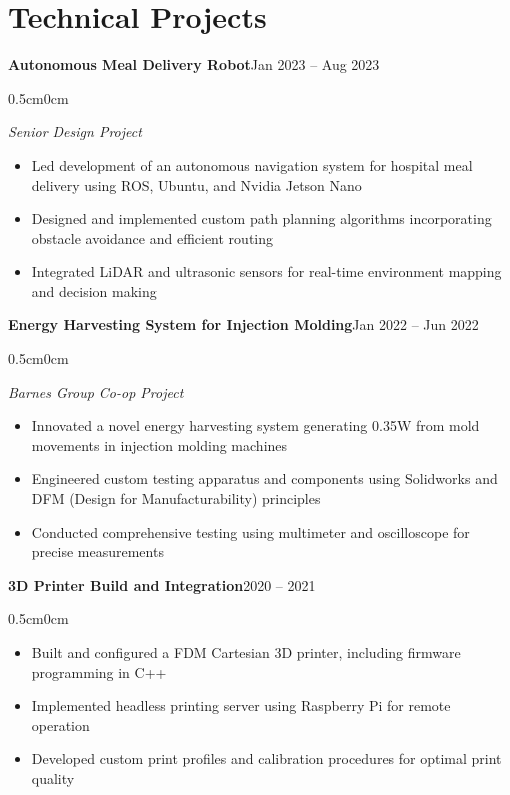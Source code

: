 \documentclass[10pt]{article}
\newenvironment{onecolentry}{
    \begin{adjustwidth}{0.5cm}{0cm}
}{
    \end{adjustwidth}
}
\newenvironment{highlights}{
    \begin{itemize}[
        leftmargin=0.5cm,
        rightmargin=0cm,
        itemindent=0cm,
        labelwidth=0.3cm,
        labelsep=0.2cm,
        align=left,
        itemsep=0.05cm,
        topsep=0.05cm,
        parsep=0.05cm,
        partopsep=0pt
    ]
}{
    \end{itemize}
    \vspace{0.1cm}
}
\begin{document}
    \section{Technical Projects}
    \begin{twocolentry}{\textbf{Autonomous Meal Delivery Robot}}{Jan 2023 -- Aug 2023}
    \end{twocolentry}
    \begin{onecolentry}
    \textit{Senior Design Project}
    \begin{highlights}
        \item Led development of an autonomous navigation system for hospital meal delivery using ROS, Ubuntu, and Nvidia Jetson Nano
        \item Designed and implemented custom path planning algorithms incorporating obstacle avoidance and efficient routing
        \item Integrated LiDAR and ultrasonic sensors for real-time environment mapping and decision making
    \end{highlights}
    \end{onecolentry}

    \begin{twocolentry}{\textbf{Energy Harvesting System for Injection Molding}}{Jan 2022 -- Jun 2022}
    \end{twocolentry}
    \begin{onecolentry}
    \textit{Barnes Group Co-op Project}
    \begin{highlights}
        \item Innovated a novel energy harvesting system generating 0.35W from mold movements in injection molding machines
        \item Engineered custom testing apparatus and components using Solidworks and DFM (Design for Manufacturability) principles
        \item Conducted comprehensive testing using multimeter and oscilloscope for precise measurements
    \end{highlights}
    \end{onecolentry}

    \begin{twocolentry}{\textbf{3D Printer Build and Integration}}{2020 -- 2021}
    \end{twocolentry}
    \begin{onecolentry}
    \begin{highlights}
        \item Built and configured a FDM Cartesian 3D printer, including firmware programming in C++
        \item Implemented headless printing server using Raspberry Pi for remote operation
        \item Developed custom print profiles and calibration procedures for optimal print quality
    \end{highlights}
    \end{onecolentry}
\end{document}
